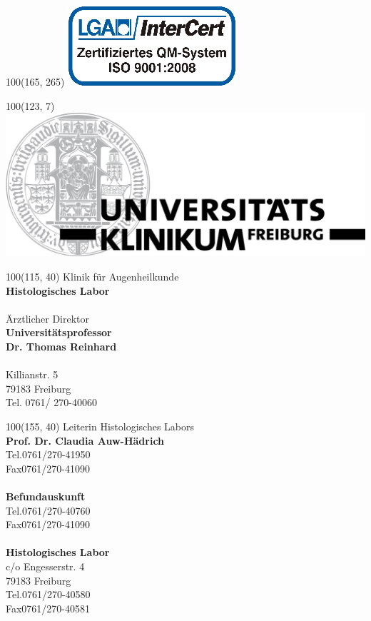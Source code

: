 \documentclass[12pt]{g-brief}
\begin{document}
\baselineskip10pt

\textblockorigin{0in}{0in}
\setlength{\TPHorizModule}{1mm}
\setlength{\TPVertModule}{1mm}

{
\begin{textblock}{100}(165, 265) 
\includegraphics[scale=0.4]{LogoFrei.png}
\end{textblock}
}

{
\begin{textblock}{100}(123, 7) 
\includegraphics[scale=0.25]{Formuladr.png}
\end{textblock}
}

{
\scriptsize
\begin{textblock}{100}(115, 40) 
Klinik für Augenheilkunde \\
\textbf{Histologisches Labor}\\\\
Ärztlicher Direktor\\
\textbf{Universitätsprofessor\\
Dr. Thomas Reinhard}\\\\
Killianstr. 5\\
79183 Freiburg\\
Tel. 0761/ 270-40060\\
\end{textblock}
}

{
\scriptsize
\begin{textblock}{100}(155, 40) 
Leiterin Histologisches Labors\\
\textbf{Prof. Dr. Claudia Auw-Hädrich}\\
Tel.0761/270-41950\\
Fax0761/270-41090\\\\
\textbf{Befundauskunft}\\
Tel.0761/270-40760\\
Fax0761/270-41090\\\\
\textbf{Histologisches Labor}\\
c/o Engesserstr. 4\\
79183 Freiburg\\
Tel.0761/270-40580\\
Fax0761/270-40581
\end{textblock}
}

\begin{g-brief}
 \end{g-brief}
\end{document}
